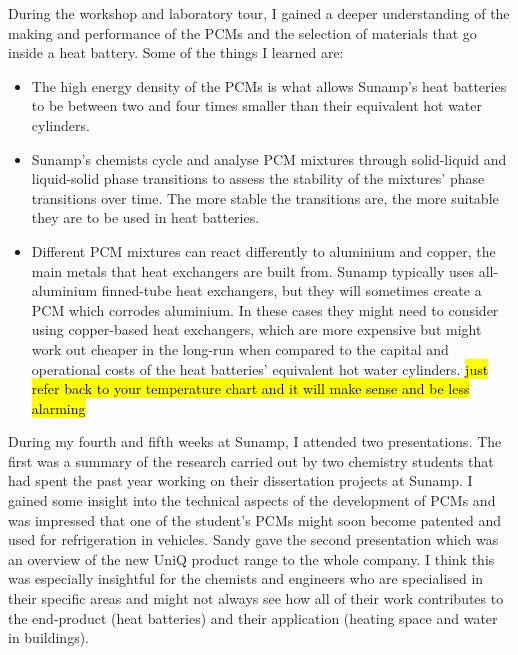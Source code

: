 During the workshop and laboratory tour, I gained a deeper understanding of the making and performance of the PCMs and the selection of materials that go inside a heat battery.
Some of the things I learned are:
\begin{itemize}
    \item The high energy density of the PCMs is what allows Sunamp's heat batteries to be between two and four times smaller than their equivalent hot water cylinders.
    \item Sunamp's chemists cycle and analyse PCM mixtures through solid-liquid and liquid-solid phase transitions to assess the stability of the mixtures' phase transitions over time. The more stable the transitions are, the more suitable they are to be used in heat batteries.
    \item Different PCM mixtures can react differently to aluminium and copper, the main metals that heat exchangers are built from.
    Sunamp typically uses all-aluminium finned-tube heat exchangers, but they will sometimes create a PCM which corrodes aluminium.
    In these cases they might need to consider using copper-based heat exchangers, which are more expensive but might work out cheaper in the long-run when compared to the capital and operational costs of the heat batteries' equivalent hot water cylinders.
    \hl{just refer back to your temperature chart and it will make sense and be less alarming}
\end{itemize}

During my fourth and fifth weeks at Sunamp, I attended two presentations.
The first was a summary of the research carried out by two chemistry students that had spent the past year working on their dissertation projects at Sunamp.
I gained some insight into the technical aspects of the development of PCMs and was impressed that one of the student's PCMs might soon become patented and used for refrigeration in vehicles.
Sandy gave the second presentation which was an overview of the new UniQ product range to the whole company.
I think this was especially insightful for the chemists and engineers who are specialised in their specific areas and might not always see how all of their work contributes to the end-product (heat batteries) and their application (heating space and water in buildings).

